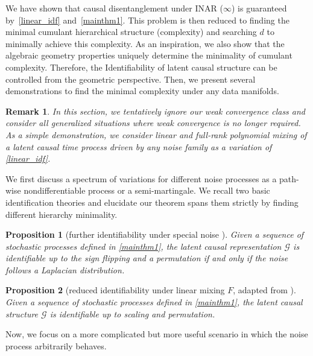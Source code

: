 \documentclass[10pt]{article}
\numberwithin{figure}{section}
\newtheorem{proposition}{Proposition}[section]
\newtheorem{remark}{Remark}
\begin{document}
We have shown that causal disentanglement under INAR ($\infty$) is guaranteed by~\autoref{linear_idf} and~\autoref{mainthm1}. This problem is then reduced to finding the minimal cumulant hierarchical structure (complexity) and searching $d$ to minimally achieve this complexity.  As an inspiration, we also show that the algebraic geometry properties uniquely determine the minimality of cumulant complexity. Therefore, the Identifiability of latent causal structure can be controlled from the geometric perspective. Then, we present several demonstrations to find the minimal complexity under any data manifolds. 
\begin{remark}
    In this section, we tentatively ignore our weak convergence class and consider all generalized situations where weak convergence is no longer required. As a simple demonstration, we consider linear and full-rank polynomial mixing of a latent causal time process driven by any noise family as a variation of \autoref{linear_idf}.
\end{remark}
We first discuss a spectrum of variations for different noise processes as a path-wise nondifferentiable process or a semi-martingale. We recall two basic identification theories and elucidate our theorem spans them strictly by finding different hierarchy minimality. 
\begin{proposition}[further identifiability under special noise ]\label{mainprop1}
    Given a sequence of stochastic processes defined in \autoref{mainthm1}, the latent causal representation $\mathcal{G}$ is identifiable up to the sign flipping and a permutation if and only if the noise follows a Laplacian distribution.
\end{proposition}
\begin{proposition}[reduced identifiability under linear mixing $F$, adapted from \cite{carreno2024linear}]\label{mainprop2}
    Given a sequence of stochastic processes defined in \autoref{mainthm1}, the latent causal structure $\mathcal{G}$  is identifiable up to scaling and permutation.
\end{proposition}

Now, we focus on a more complicated but more useful scenario in which the noise process arbitrarily behaves. 
\end{document}
